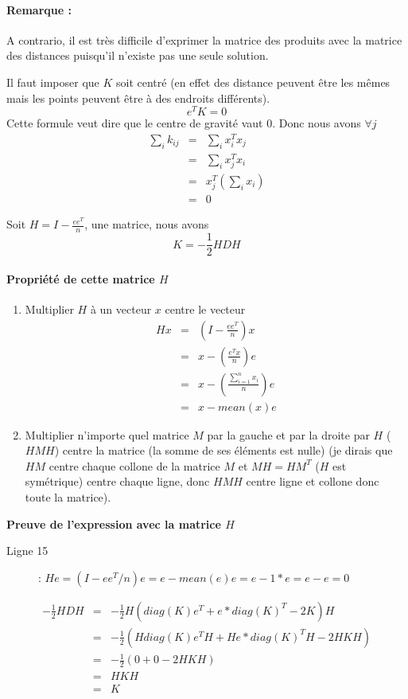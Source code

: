 \documentclass[a4paper, 11pt, onecolumn]{article}
\begin{document}
\begin{enumerate}
\paragraph{Remarque :} A contrario, il est très difficile d'exprimer la matrice des produits
avec la matrice des distances puisqu'il n'existe pas une seule solution.


Il faut imposer que $K$ soit centré (en effet des distance peuvent être les mêmes mais les points peuvent être à des endroits différents).
$$e^TK = 0$$
Cette formule veut dire que le centre de gravité vaut 0. Donc nous avons $\forall j$
\begin{eqnarray}
\sum_i k_{ij} &=& \sum_i x_i^Tx_j\\
&=& \sum_i x_j^Tx_i\\
&=& x_j^T (\sum_ix_i)\\
&=& 0
\end{eqnarray}

Soit $H = I-\frac{ee^T}{n}$, une matrice, nous avons
$$K = -\frac{1}{2}HDH$$

\paragraph{Propriété de cette matrice $H$}
\begin{enumerate}
\item Multiplier $H$ à un vecteur $x$ centre le vecteur
\begin{eqnarray}
Hx &=& \left(I-\frac{ee^T}{n}\right)x\\
&=& x - \left(\frac{e^Tx}{n}\right)e\\
&=& x - \left(\frac{\sum_{i=1}^n x_i}{n}\right)e\\
&=& x - mean(x)e
\end{eqnarray}
\item Multiplier n'importe quel matrice $M$ par la gauche et par la droite par $H$ ($HMH$) centre la matrice (la somme de ses éléments est nulle) (je dirais que $HM$ centre chaque collone de la matrice $M$ et $MH=HM^T$ ($H$ est symétrique) centre chaque ligne, donc $HMH$ centre ligne et collone donc toute la matrice).
\end{enumerate}

\textbf{Preuve de l'expression avec la matrice $H$}
\begin{framed}
  \begin{description}
    \item[Ligne 15] : $He = (I-ee^T/n)e = e-mean(e)e=e-1*e=e-e=0$
  \end{description}
\begin{eqnarray}
-\frac{1}{2}HDH &=& -\frac{1}{2}H(diag(K)e^T + e*diag(K)^T-2K)H\\
&=& -\frac{1}{2}(Hdiag(K)e^TH + He*diag(K)^TH-2HKH)\\
&=& -\frac{1}{2}(0 + 0-2HKH)\\
&=& HKH \\
&=& K
\end{eqnarray}
\end{framed}


\end{enumerate}
\end{document}
